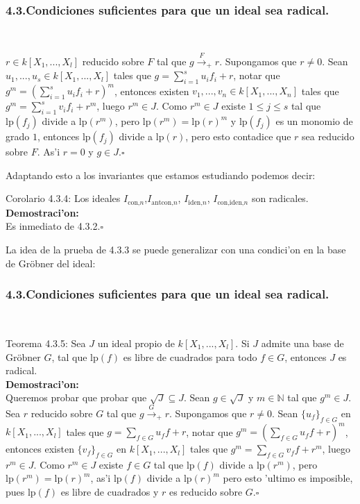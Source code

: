 \documentclass[10pt]{beamer}
\renewcommand{\N}{\mathbb{N}}
\renewcommand{\lp}{\text{lp}}
\begin{document}
\begin{frame}
\frametitle{4.3.Condiciones suficientes para que un ideal sea radical.}\\
\begin{block}{}
 $r\in k[X_1,...,X_l]$ reducido sobre $F$ tal que $g \overset{F}{\longrightarrow}_{+}r$. Supongamos que $r \not = 0$. Sean $u_1,...,u_s \in k[X_1,...,X_l]$ tales que $g=\sum_{i=1}^{s}{u_if_i}+r$, notar que $g^m= \left(\sum_{i=1}^{s}{u_if_i}+r\right)^m$, entonces existen $v_1,...,v_n \in k[X_1,...,X_n]$ tales que $g^m=\sum_{i=1}^{s}{v_if_i}+r^m$, luego $r^m \in J$. Como $r^m \in J$ existe $1 \leq j \leq s$ tal que $\lp(f_j)$ divide a $\lp(r^m)$, pero $\lp(r^m)=\lp(r)^m$ y $\lp(f_j)$ es un monomio de grado $1$, entonces $\lp(f_j)$ divide a $\lp(r)$, pero esto contadice que $r$ sea reducido sobre $F$. As'i $r=0$ y $g \in J$.\hfill $\square$\\
\end{block}
Adaptando esto a los invariantes que estamos estudiando podemos decir:\\
\begin{block}{Corolario 4.3.4:}
Los ideales $I_{\text{con,}n}$,$I_{\text{antcon,}n}$, $I_{\text{iden,}n}$, $I_{\text{con,iden,}n}$ son radicales.\\
\textbf{Demostraci'on:}\\
Es inmediato de 4.3.2.\hfill $\square$\\
\end{block}
La idea de la prueba de 4.3.3 se puede generalizar con una condici'on en la base de Gr\"obner del ideal:\\
\end{frame}

\begin{frame}
\frametitle{4.3.Condiciones suficientes para que un ideal sea radical.}\\
\begin{block}{Teorema 4.3.5:}
Sea $J$ un ideal propio de $k[X_1,...,X_l]$. Si $J$ admite una base de Gr\"obner $G$, tal que $\lp(f)$ es libre de cuadrados para todo $f \in G$, entonces $J$ es radical.\\
\textbf{Demostraci'on:}\\
Queremos probar que probar que $\sqrt{J}\subseteq J$. Sean $g \in \sqrt{J}$ y $m \in \N$ tal que $g^m \in J$. Sea $r$ reducido sobre $G$ tal que $g \overset{G}{\longrightarrow}_{+}r$. Supongamos que $r \not = 0$. Sean $\{u_f\}_{f \in G}$ en $k[X_1,...,X_l]$ tales que $g=\sum_{f \in G}{u_ff}+r$, notar que $g^m= \left(\sum_{f \in G}{u_ff}+r\right)^m$, entonces existen $\{v_f\}_{f\in G}$ en $k[X_1,...,X_l]$ tales que $g^m=\sum_{f \in G}{v_ff}+r^m$, luego $r^m \in J$. Como $r^m \in J$ existe $f \in G$ tal que $\lp(f)$ divide a $\lp(r^m)$, pero $\lp(r^m)=\lp(r)^m$, as'i $\lp(f)$ divide a $\lp(r)^m$ pero esto 'ultimo es imposible, pues $\lp(f)$ es libre de cuadrados y $r$ es reducido sobre $G$.\hfill $\square$\\
\end{block}
\vspace{6cm}
\end{frame}
\end{document}
